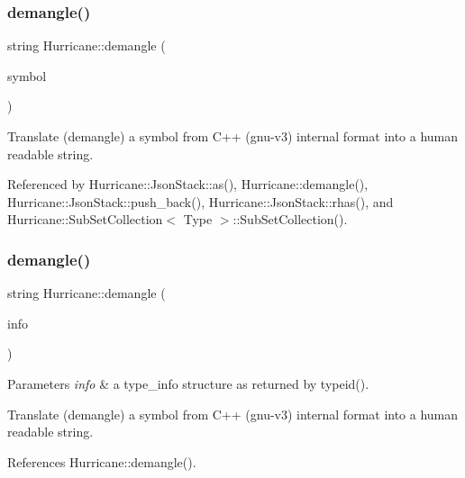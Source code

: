 \subsubsection{\texorpdfstring{demangle()}{demangle()}\hspace{0.1cm}{\footnotesize\ttfamily [1/2]}}
{\footnotesize\ttfamily string Hurricane\+::demangle (\begin{DoxyParamCaption}\item[{const char $\ast$}]{symbol }\end{DoxyParamCaption})}

Translate (demangle) a symbol from C++ ({\ttfamily gnu-\/v3}) internal format into a human readable {\ttfamily string}. 

Referenced by Hurricane\+::\+Json\+Stack\+::as(), Hurricane\+::demangle(), Hurricane\+::\+Json\+Stack\+::push\+\_\+back(), Hurricane\+::\+Json\+Stack\+::rhas(), and Hurricane\+::\+Sub\+Set\+Collection$<$ Type $>$\+::\+Sub\+Set\+Collection().

\mbox{\label{group__Generalities_gae4be209e8a3f2227b0c7a22246817c6f}} 
\subsubsection{\texorpdfstring{demangle()}{demangle()}\hspace{0.1cm}{\footnotesize\ttfamily [2/2]}}
{\footnotesize\ttfamily string Hurricane\+::demangle (\begin{DoxyParamCaption}\item[{const type\+\_\+info \&}]{info }\end{DoxyParamCaption})\hspace{0.3cm}{\ttfamily [inline]}}


\begin{DoxyParams}{Parameters}
{\em info} & a type\+\_\+info structure as returned by {\ttfamily typeid()}.\\
\hline
\end{DoxyParams}
Translate (demangle) a symbol from C++ ({\ttfamily gnu-\/v3}) internal format into a human readable {\ttfamily string}. 

References Hurricane\+::demangle().

